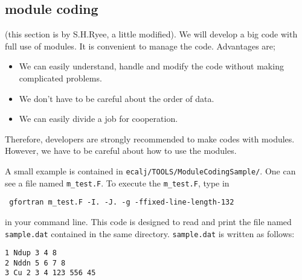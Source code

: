 \documentclass[a4paper,10pt,fleqn]{article}
\begin{document}
\subsection{module coding}
(this section is by S.H.Ryee, a little modified).
We will develop a big code with full use of modules.
It is convenient to manage the code. Advantages are;
\begin{itemize}
 \item We can easily understand, handle and modify the code without making
 complicated problems.
 \item We don't have to be careful about the order of data.
 \item We can easily divide a job for cooperation.
\end{itemize} 
Therefore, developers are strongly recommended to make codes with modules. 
However, we have to be careful about how to use the modules.

A small example is contained in  \verb#ecalj/TOOLS/ModuleCodingSample/#. One can see a file named \verb#m_test.F#. To execute the \verb#m_test.F#, type in \begin{verbatim} gfortran m_test.F -I. -J. -g -ffixed-line-length-132 \end{verbatim} in your command line. This code is designed to read and print the file named \verb#sample.dat# contained in the same directory. \verb#sample.dat# is written as follows:
\begin{verbatim}
1 Ndup 3 4 8
2 Nddn 5 6 7 8
3 Cu 2 3 4 123 556 45
\end{verbatim}
\end{document}
